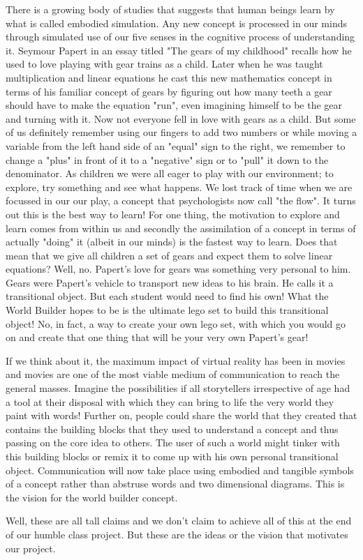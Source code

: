 There is a growing body of studies that suggests that human beings learn by what is called embodied simulation. Any new concept is processed in our minds through simulated use of our five senses in the cognitive process of understanding it. Seymour Papert in an essay titled "The gears of my childhood" recalls how he used to love playing with gear trains as a child. Later when he was taught multiplication and linear equations he cast this new mathematics concept in terms of his familiar concept of gears by figuring out how many teeth a gear should have to make the equation "run", even imagining himself to be the gear and turning with it. Now not everyone fell in love with gears as a child. But some of us definitely remember using our fingers to add two numbers or while moving a variable from the left hand side of an "equal" sign to the right, we remember to change a "plus" in front of it to a "negative" sign or to "pull" it down to the denominator. As children we were all eager to play with our environment; to explore, try something and see what happens. We lost track of time when we are focussed in our our play, a concept that psychologists now call "the flow". It turns out this is the best way to learn! For one thing, the motivation to explore and learn comes from within us and secondly the assimilation of a concept in terms of actually "doing" it (albeit in our minds) is the fastest way to learn. Does that mean that we give all children a set of gears and expect them to solve linear equations? Well, no. Papert's love for gears was something very personal to him. Gears were Papert's vehicle to transport new ideas to his brain. He calls it a transitional object. But each student would need to find his own! What the World Builder hopes to be is the ultimate lego set to build this transitional object! No, in fact, a way to create your own lego set, with which you would go on and create that one thing that will be your very own Papert's gear! 



If we think about it, the maximum impact of virtual reality has been in movies and movies are one of the most viable medium of communication to reach the general masses. Imagine the possibilities if all storytellers irrespective of age had a tool at their disposal with which they can bring to life the very world they paint with words! Further on, people could share the world that they created that contains the building blocks that they used to understand a concept and thus passing on the core idea to others. The user of such a world might tinker with this building blocks or remix it to come up with his own personal transitional object. Communication will now take place using embodied and tangible symbols of a concept rather than abstruse words and two dimensional diagrams. This is the vision for the world builder concept.

Well, these are all tall claims and we don't claim to achieve all of this at the end of our humble class project. But these are the ideas or the vision that motivates our project.